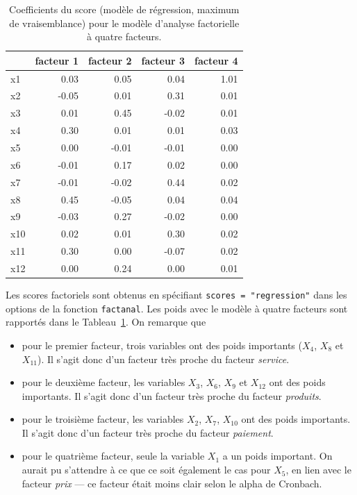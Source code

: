 \documentclass[
  11pt,
  letterpaper,
]{scrbook}
\providecommand{\tightlist}{%
  \setlength{\itemsep}{0pt}\setlength{\parskip}{0pt}}\usepackage{longtable,booktabs,array}
\theoremstyle{definition}
\theoremstyle{remark}
\begin{document}
\begin{longtable}[t]{lrrrr}

\caption{\label{tbl-scores}Coefficients du score (modèle de régression,
maximum de vraisemblance) pour le modèle d'analyse factorielle à quatre
facteurs.}

\tabularnewline

\toprule
 & facteur 1 & facteur 2 & facteur 3 & facteur 4\\
\midrule
x1 & 0.03 & 0.05 & 0.04 & 1.01\\
x2 & -0.05 & 0.01 & 0.31 & 0.01\\
x3 & 0.01 & 0.45 & -0.02 & 0.01\\
x4 & 0.30 & 0.01 & 0.01 & 0.03\\
x5 & 0.00 & -0.01 & -0.01 & 0.00\\
\addlinespace
x6 & -0.01 & 0.17 & 0.02 & 0.00\\
x7 & -0.01 & -0.02 & 0.44 & 0.02\\
x8 & 0.45 & -0.05 & 0.04 & 0.04\\
x9 & -0.03 & 0.27 & -0.02 & 0.00\\
x10 & 0.02 & 0.01 & 0.30 & 0.02\\
\addlinespace
x11 & 0.30 & 0.00 & -0.07 & 0.02\\
x12 & 0.00 & 0.24 & 0.00 & 0.01\\
\bottomrule

\end{longtable}

Les scores factoriels sont obtenus en spécifiant
\texttt{scores\ =\ "regression"} dans les options de la fonction
\texttt{factanal}. Les poids avec le modèle à quatre facteurs sont
rapportés dans le Tableau~\ref{tbl-scores}. On remarque que

\begin{itemize}
\tightlist
\item
  pour le premier facteur, trois variables ont des poids importants
  (\(X_4\), \(X_8\) et \(X_{11}\)). Il s'agit donc d'un facteur très
  proche du facteur \emph{service}.
\item
  pour le deuxième facteur, les variables \(X_3\), \(X_6\), \(X_9\) et
  \(X_{12}\) ont des poids importants. Il s'agit donc d'un facteur très
  proche du facteur \emph{produits}.
\item
  pour le troisième facteur, les variables \(X_2\), \(X_7\), \(X_{10}\)
  ont des poids importants. Il s'agit donc d'un facteur très proche du
  facteur \emph{paiement}.
\item
  pour le quatrième facteur, seule la variable \(X_1\) a un poids
  important. On aurait pu s'attendre à ce que ce soit également le cas
  pour \(X_5\), en lien avec le facteur \emph{prix} --- ce facteur était
  moins clair selon le alpha de Cronbach.
\end{itemize}
\end{document}
